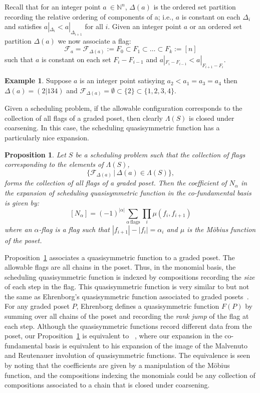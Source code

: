 \documentclass[12pt,reqno]{amsart}
\numberwithin{definition}{section}
\newtheorem{proposition}[definition]{Proposition}
\theoremstyle{definition}
\newtheorem{example}[definition]{Example}
\newcommand{\allow}{\Lambda} %
\begin{document}
  Recall that for an integer point $a\ \in \mathbb{N}^n$,
  $\Delta(a)$ is the ordered set partition recording the relative
  ordering of components of a; i.e., $a$ is constant on each $\Delta_i$
  and satisfies $a|_{\Delta_i} < a|_{\Delta_{i+1}}$ for all $i$.
Given an integer point $a$ or an ordered set partition $\Delta(a)$ we now associate a flag:
$$\mathscr{F}_{a} = \mathscr{F}_{\Delta(a)} := F_0 \subset F_1 \subset \ldots \subset F_k := [n]$$
such that $a$ is constant on each set $F_i - F_{i-1}$ and  $a|_{F_i -
  F_{i-1}} < a|_{F_{i+1} - F_{i}} $. 

\begin{example}
Suppose $a$ is an integer point satisying $a_2 < a_1 = a_3 = a_4$ then $\Delta(a) = (2|134)$ and $\mathscr{F}_{\Delta(a)} = {\emptyset \subset \{2\} \subset \{1,2,3,4\}}$.
\end{example}



Given a scheduling problem, if the allowable configuration corresponds
to the collection of all flags of a graded poset, then clearly $\allow(S)$ is closed under coarsening.  In this case, the scheduling 
quasisymmetric function has a particularly nice expansion.

\begin{proposition}
\label{prop:flags}
Let $S$ be a scheduling problem such that the collection of flags corresponding to the elements of $\allow(S)$,
$$\{ \mathscr{F}_{\Delta(a)} \, | \, \Delta(a) \in \allow(S) \},$$
forms the collection of all flags of a graded poset.  Then the coefficient of $N_{\alpha}$ in the expansion of scheduling quasisymmetric function in the co-fundamental basis is given by:
$$[N_{\alpha}] = (-1)^{|\alpha|} \sum_{\alpha \, \textrm{flags}} \prod_i \mu(f_i,f_{i+1})$$
where an $\alpha$-flag is a flag such that $|f_{i+1}| - |f_i| = \alpha_i$ and $\mu$ is the M\"{o}bius function of the poset.
\end{proposition}



Proposition~\ref{prop:flags} associates a quasisymmetric function to a
graded poset.  The allowable flags are all chains in the poset.  Thus,
in the monomial basis, the scheduling quasisymmetric function is indexed
by compositions recording the \emph{size} of each step in the flag.  This
quasisymmetric function is very similar to but not the same as
Ehrenborg's quasisymmetric function associated to graded
posets~\cite{Ehrenborg}.  For any graded poset $P$, Ehrenborg defines
a quasisymmetric function $F(P)$ by summing over all chains of the
poset and recording the \emph{rank jump} of the flag at each step.  Although
the quasisymmetric functions record different data from the poset, our
Proposition~\ref{prop:flags} is equivalent to
~\cite[Proposition~5.1]{Ehrenborg}, where our expansion in the
co-fundamental basis is equivalent to his expansion of the image of
the Malvenuto and Reutenauer involution of quasisymmetric functions.
The equivalence is seen by noting that the coefficients are given by a
manipulation of the M\"obius function, and the compositions indexing the
monomials could be any collection of compositions associated to a
chain that is closed under coarsening.
\end{document}

